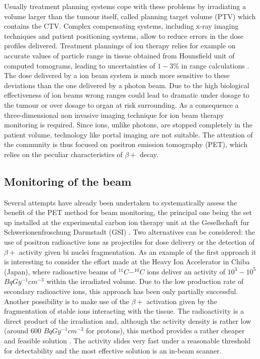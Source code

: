 Usually treatment planning systems cope with these problems by irradiating a volume larger than the tumour itself, called planning target volume (PTV) which contains the CTV. Complex compensating systems, including x-ray imaging techniques and patient positioning systems, allow to reduce errors in the dose profiles delivered. Treatment plannings of ion therapy relies for example on accurate values of particle range in tissue obtained from Hounsfield unit of computed tomograms, leading to uncertainties of $1-3\%$ in range calculations \cite{Enghardt2004}.
The dose delivered by a ion beam system is much more sensitive to these deviations than the one delivered by a photon beam. Due to the high biological effectiveness of ion beams wrong ranges could lead to dramatic under dosage to the tumour or over dosage to organ at risk surrounding.
As a consequence a three-dimensional non invasive imaging technique for ion beam therapy monitoring is required. Since ions, unlike photons, are stopped completely in the patient volume, technology like portal imaging are not suitable. The attention of the community is thus focused on positron emission tomography (PET), which relies on the peculiar characteristics of $\beta +$ decay.

\subsection{Monitoring of the beam}

Several attempts have already been undertaken to systematically assess the benefit of the PET method for beam monitoring, the principal one being the set up installed at the experimental carbon ion therapy unit at the Gesellschaft fur Schwerionenfroschung Darmstadt (GSI) \cite{Parodi2004}.
Two alternatives can be considered: the use of positron radioactive ions as projectiles for dose delivery or the detection of $\beta +$ activity given bi nuclei fragmentation.
As an example of the first approach it is interesting to consider the effort made at the Heavy Ion Accelerator in Chiba (Japan), where radioactive beams of $^{11}C - ^{10}C$ ions deliver an activity of $10^{3} - 10^{5}$ $Bq Gy^{-1} cm^{-3}$ within the irradiated volume.
Due to the low production rate of secondary radioactive ions, this approach has been only partially successful.
Another possibility is to make use of the $\beta +$ activation given by the fragmentation of stable ions interacting with the tissue.
The radioactivity is a direct product of the irradiation and, although the activity density is rather low (around 600 $Bq Gy^{-1} cm^{-3}$ for protons), this method provides a rather cheaper and feasible solution \cite{Enghardt2004}.
The activity slides very fast under a reasonable threshold for detectability and the most effective solution is an in-beam scanner.

